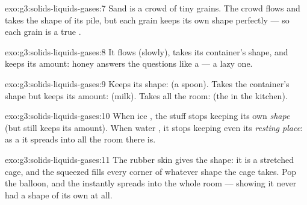 \begin{solution}{exo:g3:solids-liquids-gases:7}
Sand is a crowd of tiny  grains. The crowd flows and takes the
shape of its pile, but each grain keeps its own shape perfectly ---
so each grain is a true .
\end{solution}

\begin{solution}{exo:g3:solids-liquids-gases:8}
It flows (slowly), takes its container's shape, and keeps its
amount: honey answers the questions like a  --- a lazy one.
\end{solution}

\begin{solution}{exo:g3:solids-liquids-gases:9}
Keeps its shape:  (a spoon). Takes the container's shape but
keeps its amount:  (milk). Takes all the room:  (the  in
the kitchen).
\end{solution}

\begin{solution}{exo:g3:solids-liquids-gases:10}
When ice , the stuff stops keeping its own \emph{shape} (but
still keeps its amount). When water , it stops keeping
even its \emph{resting place}: as a  it spreads into all the room
there is.
\end{solution}

\begin{solution}{exo:g3:solids-liquids-gases:11}
The rubber skin gives the shape: it is a stretched  cage, and
the squeezed  fills every corner of whatever shape the cage
takes. Pop the balloon, and the  instantly spreads into the whole
room --- showing it never had a shape of its own at all.
\end{solution}
